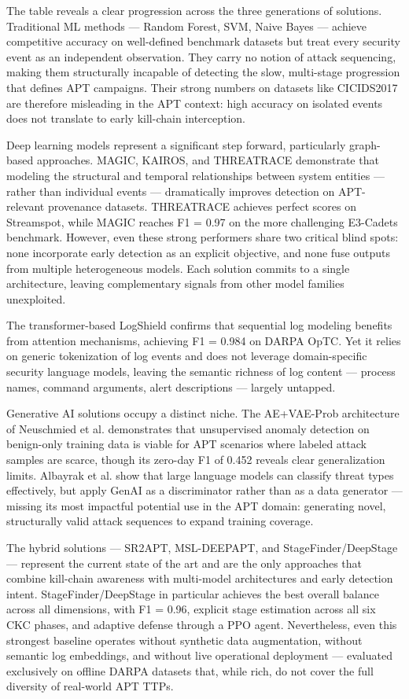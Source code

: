 The table reveals a clear progression across the three generations of solutions. Traditional ML methods --- Random Forest, SVM, Naive Bayes --- achieve competitive accuracy on well-defined benchmark datasets but treat every security event as an independent observation. They carry no notion of attack sequencing, making them structurally incapable of detecting the slow, multi-stage progression that defines APT campaigns. Their strong numbers on datasets like CICIDS2017 are therefore misleading in the APT context: high accuracy on isolated events does not translate to early kill-chain interception.

Deep learning models represent a significant step forward, particularly graph-based approaches. MAGIC, KAIROS, and THREATRACE demonstrate that modeling the structural and temporal relationships between system entities --- rather than individual events --- dramatically improves detection on APT-relevant provenance datasets. THREATRACE achieves perfect scores on Streamspot, while MAGIC reaches F1 = 0.97 on the more challenging E3-Cadets benchmark. However, even these strong performers share two critical blind spots: none incorporate early detection as an explicit objective, and none fuse outputs from multiple heterogeneous models. Each solution commits to a single architecture, leaving complementary signals from other model families unexploited.

The transformer-based LogShield confirms that sequential log modeling benefits from attention mechanisms, achieving F1 = 0.984 on DARPA OpTC. Yet it relies on generic tokenization of log events and does not leverage domain-specific security language models, leaving the semantic richness of log content --- process names, command arguments, alert descriptions --- largely untapped.

Generative AI solutions occupy a distinct niche. The AE+VAE-Prob architecture of Neuschmied et al. demonstrates that unsupervised anomaly detection on benign-only training data is viable for APT scenarios where labeled attack samples are scarce, though its zero-day F1 of 0.452 reveals clear generalization limits. Albayrak et al. show that large language models can classify threat types effectively, but apply GenAI as a discriminator rather than as a data generator --- missing its most impactful potential use in the APT domain: generating novel, structurally valid attack sequences to expand training coverage.

The hybrid solutions --- SR2APT, MSL-DEEPAPT, and StageFinder/DeepStage --- represent the current state of the art and are the only approaches that combine kill-chain awareness with multi-model architectures and early detection intent. StageFinder/DeepStage in particular achieves the best overall balance across all dimensions, with F1 = 0.96, explicit stage estimation across all six CKC phases, and adaptive defense through a PPO agent. Nevertheless, even this strongest baseline operates without synthetic data augmentation, without semantic log embeddings, and without live operational deployment --- evaluated exclusively on offline DARPA datasets that, while rich, do not cover the full diversity of real-world APT TTPs.

